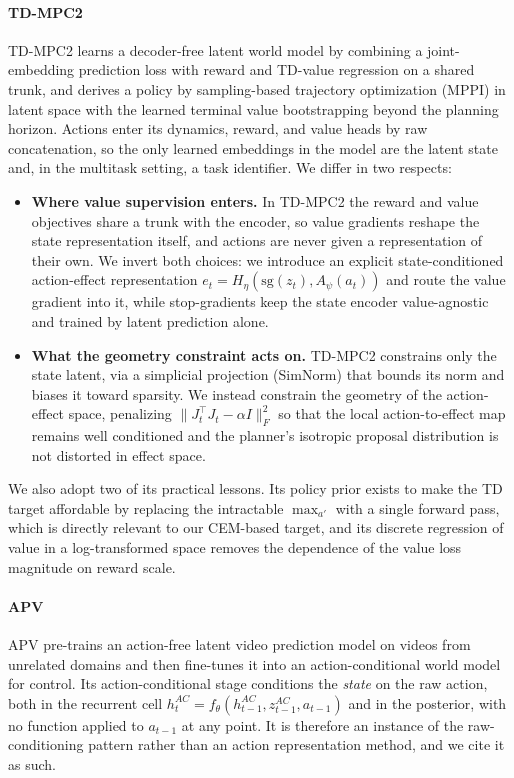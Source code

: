 ﻿\documentclass{article}
\begin{document}
\paragraph{TD-MPC2}
TD-MPC2 learns a decoder-free latent world model by combining a joint-embedding prediction loss with reward and TD-value regression on a shared trunk, and derives a policy by sampling-based trajectory optimization (MPPI) in latent space with the learned terminal value bootstrapping beyond the planning horizon. Actions enter its dynamics, reward, and value heads by raw concatenation, so the only learned embeddings in the model are the latent state and, in the multitask setting, a task identifier. We differ in two respects:
\begin{itemize}
  \item \textbf{Where value supervision enters.} In TD-MPC2 the reward and value objectives share a trunk with the encoder, so value gradients reshape the state representation itself, and actions are never given a representation of their own. We invert both choices: we introduce an explicit state-conditioned action-effect representation $e_t = H_\eta(\mathrm{sg}(z_t), A_\psi(a_t))$ and route the value gradient into it, while stop-gradients keep the state encoder value-agnostic and trained by latent prediction alone.
  \item \textbf{What the geometry constraint acts on.} TD-MPC2 constrains only the state latent, via a simplicial projection (SimNorm) that bounds its norm and biases it toward sparsity. We instead constrain the geometry of the action-effect space, penalizing $\|J_t^\top J_t - \alpha I\|_F^2$ so that the local action-to-effect map remains well conditioned and the planner's isotropic proposal distribution is not distorted in effect space.
\end{itemize}
We also adopt two of its practical lessons. Its policy prior exists to make the
TD target affordable by replacing the intractable $\max_{a'}$ with a single
forward pass, which is directly relevant to our CEM-based target, and its
discrete regression of value in a log-transformed space removes the dependence
of the value loss magnitude on reward scale.

\paragraph{APV}
APV pre-trains an action-free latent video prediction model on videos from
unrelated domains and then fine-tunes it into an action-conditional world model
for control. Its action-conditional stage conditions the \emph{state} on the raw
action, both in the recurrent cell $h^{AC}_t = f_\theta(h^{AC}_{t-1}, z^{AC}_{t-1}, a_{t-1})$
and in the posterior, with no function applied to $a_{t-1}$ at any point. It is
therefore an instance of the raw-conditioning pattern rather than an action
representation method, and we cite it as such.
\end{document}
